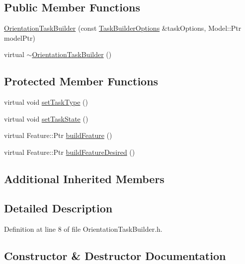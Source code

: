 \subsection*{Public Member Functions}
\begin{DoxyCompactItemize}
\item 
\hyperlink{classocra_1_1OrientationTaskBuilder_ae21c16c5b7c2f47aaff15a33cc49a337}{Orientation\+Task\+Builder} (const \hyperlink{classocra_1_1TaskBuilderOptions}{Task\+Builder\+Options} \&task\+Options, Model\+::\+Ptr model\+Ptr)
\item 
virtual \hyperlink{classocra_1_1OrientationTaskBuilder_a15053032636ee9416465134314a18226}{$\sim$\+Orientation\+Task\+Builder} ()
\end{DoxyCompactItemize}
\subsection*{Protected Member Functions}
\begin{DoxyCompactItemize}
\item 
virtual void \hyperlink{classocra_1_1OrientationTaskBuilder_a491f3d3db66afb5b5e3230983b4b15c9}{set\+Task\+Type} ()
\item 
virtual void \hyperlink{classocra_1_1OrientationTaskBuilder_ab30b211f4aa00ed4c78daae36aca6c42}{set\+Task\+State} ()
\item 
virtual Feature\+::\+Ptr \hyperlink{classocra_1_1OrientationTaskBuilder_a38d5badfcdbcdbc745f305e38af8b737}{build\+Feature} ()
\item 
virtual Feature\+::\+Ptr \hyperlink{classocra_1_1OrientationTaskBuilder_af5f11bdd9c43cb52e29054c6b293d533}{build\+Feature\+Desired} ()
\end{DoxyCompactItemize}
\subsection*{Additional Inherited Members}


\subsection{Detailed Description}


Definition at line 8 of file Orientation\+Task\+Builder.\+h.



\subsection{Constructor \& Destructor Documentation}
\hypertarget{classocra_1_1OrientationTaskBuilder_ae21c16c5b7c2f47aaff15a33cc49a337}{}\label{classocra_1_1OrientationTaskBuilder_ae21c16c5b7c2f47aaff15a33cc49a337} 
